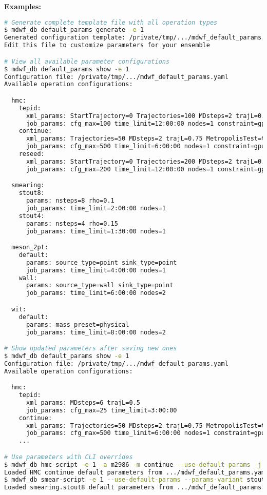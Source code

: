 \documentclass{article}
\begin{document}
\textbf{Examples:}
\begin{lstlisting}[language=bash]
# Generate complete template file with all operation types
$ mdwf_db default_params generate -e 1
Generated configuration template: /private/tmp/.../mdwf_default_params.yaml
Edit this file to customize parameters for your ensemble

# View all available parameter configurations
$ mdwf_db default_params show -e 1
Configuration file: /private/tmp/.../mdwf_default_params.yaml
Available operation configurations:

  hmc:
    tepid:
      xml_params: StartTrajectory=0 Trajectories=100 MDsteps=2 trajL=0.75 MetropolisTest=false
      job_params: cfg_max=100 time_limit=12:00:00 nodes=1 constraint=gpu cpus_per_task=32
    continue:
      xml_params: Trajectories=50 MDsteps=2 trajL=0.75 MetropolisTest=true
      job_params: cfg_max=500 time_limit=6:00:00 nodes=1 constraint=gpu cpus_per_task=32
    reseed:
      xml_params: StartTrajectory=0 Trajectories=200 MDsteps=2 trajL=0.75 MetropolisTest=true
      job_params: cfg_max=200 time_limit=12:00:00 nodes=1 constraint=gpu cpus_per_task=32

  smearing:
    stout8:
      params: nsteps=8 rho=0.1
      job_params: time_limit=2:00:00 nodes=1
    stout4:
      params: nsteps=4 rho=0.15
      job_params: time_limit=1:30:00 nodes=1

  meson_2pt:
    default:
      params: source_type=point sink_type=point
      job_params: time_limit=4:00:00 nodes=1
    wall:
      params: source_type=wall sink_type=point
      job_params: time_limit=6:00:00 nodes=2

  wit:
    default:
      params: mass_preset=physical
      job_params: time_limit=8:00:00 nodes=2

# Show updated parameters after saving new ones
$ mdwf_db default_params show -e 1
Configuration file: /private/tmp/.../mdwf_default_params.yaml
Available operation configurations:

  hmc:
    tepid:
      xml_params: MDsteps=6 trajL=0.5
      job_params: cfg_max=25 time_limit=3:00:00
    continue:
      xml_params: Trajectories=50 MDsteps=2 trajL=0.75 MetropolisTest=true
      job_params: cfg_max=500 time_limit=6:00:00 nodes=1 constraint=gpu cpus_per_task=32
    ...

# Use parameters with CLI overrides  
$ mdwf_db hmc-script -e 1 -a m2986 -m continue --use-default-params -j "nodes=2"
Loaded HMC continue default parameters from .../mdwf_default_params.yaml
$ mdwf_db smear-script -e 1 --use-default-params --params-variant stout8
Loaded smearing.stout8 default parameters from .../mdwf_default_params.yaml
\end{lstlisting}
\end{document}

